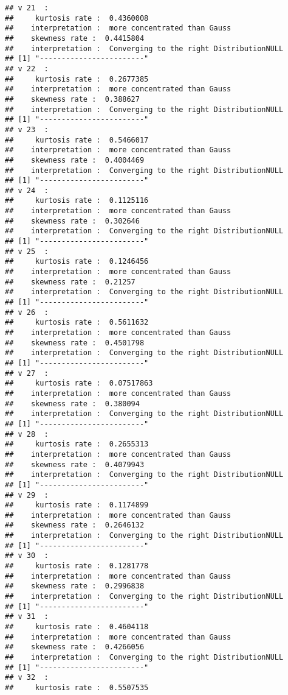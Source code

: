 \documentclass[]{article}
\begin{document}
\begin{verbatim}
## v 21  : 
##     kurtosis rate :  0.4360008 
##    interpretation :  more concentrated than Gauss 
##    skewness rate :  0.4415804 
##    interpretation :  Converging to the right DistributionNULL
## [1] "------------------------"
## v 22  : 
##     kurtosis rate :  0.2677385 
##    interpretation :  more concentrated than Gauss 
##    skewness rate :  0.388627 
##    interpretation :  Converging to the right DistributionNULL
## [1] "------------------------"
## v 23  : 
##     kurtosis rate :  0.5466017 
##    interpretation :  more concentrated than Gauss 
##    skewness rate :  0.4004469 
##    interpretation :  Converging to the right DistributionNULL
## [1] "------------------------"
## v 24  : 
##     kurtosis rate :  0.1125116 
##    interpretation :  more concentrated than Gauss 
##    skewness rate :  0.302646 
##    interpretation :  Converging to the right DistributionNULL
## [1] "------------------------"
## v 25  : 
##     kurtosis rate :  0.1246456 
##    interpretation :  more concentrated than Gauss 
##    skewness rate :  0.21257 
##    interpretation :  Converging to the right DistributionNULL
## [1] "------------------------"
## v 26  : 
##     kurtosis rate :  0.5611632 
##    interpretation :  more concentrated than Gauss 
##    skewness rate :  0.4501798 
##    interpretation :  Converging to the right DistributionNULL
## [1] "------------------------"
## v 27  : 
##     kurtosis rate :  0.07517863 
##    interpretation :  more concentrated than Gauss 
##    skewness rate :  0.380094 
##    interpretation :  Converging to the right DistributionNULL
## [1] "------------------------"
## v 28  : 
##     kurtosis rate :  0.2655313 
##    interpretation :  more concentrated than Gauss 
##    skewness rate :  0.4079943 
##    interpretation :  Converging to the right DistributionNULL
## [1] "------------------------"
## v 29  : 
##     kurtosis rate :  0.1174899 
##    interpretation :  more concentrated than Gauss 
##    skewness rate :  0.2646132 
##    interpretation :  Converging to the right DistributionNULL
## [1] "------------------------"
## v 30  : 
##     kurtosis rate :  0.1281778 
##    interpretation :  more concentrated than Gauss 
##    skewness rate :  0.2996838 
##    interpretation :  Converging to the right DistributionNULL
## [1] "------------------------"
## v 31  : 
##     kurtosis rate :  0.4604118 
##    interpretation :  more concentrated than Gauss 
##    skewness rate :  0.4266056 
##    interpretation :  Converging to the right DistributionNULL
## [1] "------------------------"
## v 32  : 
##     kurtosis rate :  0.5507535 

\end{verbatim}
\end{document}
